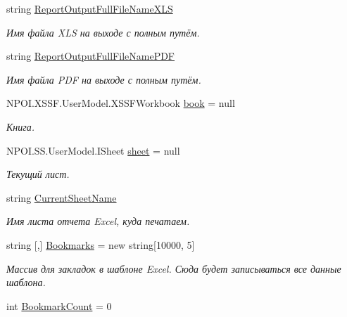\begin{DoxyCompactItemize}
string \mbox{\hyperlink{class_f_b_a_1_1_sys_report_x_l_s_x_a5b2c8bc69dd04b9e533cc492c628b264}{Report\+Output\+Full\+File\+Name\+X\+LS}}
\begin{DoxyCompactList}\small\item\em Имя файла X\+LS на выходе с полным путём. \end{DoxyCompactList}\item 
string \mbox{\hyperlink{class_f_b_a_1_1_sys_report_x_l_s_x_abc47788f3e5645dcea9efa87fc549125}{Report\+Output\+Full\+File\+Name\+P\+DF}}
\begin{DoxyCompactList}\small\item\em Имя файла P\+DF на выходе с полным путём. \end{DoxyCompactList}\item 
N\+P\+O\+I.\+X\+S\+S\+F.\+User\+Model.\+X\+S\+S\+F\+Workbook \mbox{\hyperlink{class_f_b_a_1_1_sys_report_x_l_s_x_a22c47ab700e8226d4172c265a26ba13c}{book}} = null
\begin{DoxyCompactList}\small\item\em Книга. \end{DoxyCompactList}\item 
N\+P\+O\+I.\+S\+S.\+User\+Model.\+I\+Sheet \mbox{\hyperlink{class_f_b_a_1_1_sys_report_x_l_s_x_aadf82c46105a90b408e95ac88fe65dd9}{sheet}} = null
\begin{DoxyCompactList}\small\item\em Текущий лист. \end{DoxyCompactList}\item 
string \mbox{\hyperlink{class_f_b_a_1_1_sys_report_x_l_s_x_a8efd2c3466c6013de9565a6e773d2654}{Current\+Sheet\+Name}}
\begin{DoxyCompactList}\small\item\em Имя листа отчета Excel, куда печатаем. ~\newline
\end{DoxyCompactList}\item 
string \mbox{[},\mbox{]} \mbox{\hyperlink{class_f_b_a_1_1_sys_report_x_l_s_x_adc2568d6b4aec55738552a682f3d17a3}{Bookmarks}} = new string\mbox{[}10000, 5\mbox{]}
\begin{DoxyCompactList}\small\item\em Массив для закладок в шаблоне Excel. Сюда будет записываться все данные шаблона. ~\newline
 \end{DoxyCompactList}\item 
int \mbox{\hyperlink{class_f_b_a_1_1_sys_report_x_l_s_x_ad05e7f7ac930c8d54185e2c6f7fb7b82}{Bookmark\+Count}} = 0

\end{DoxyCompactItemize}

